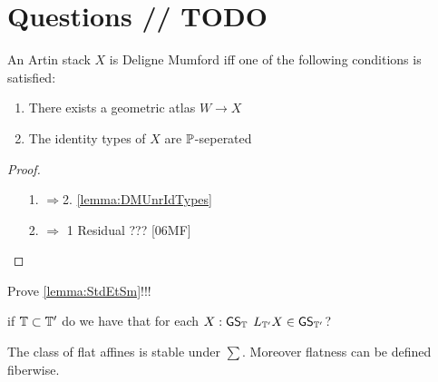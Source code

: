 \documentclass{article}
\renewcommand{\GS}{\mathsf{GS}}
\begin{document}






\section{Questions // TODO}
\begin{theorem}[TODO]
	An Artin stack $X$ is Deligne Mumford iff one of the following conditions is satisfied:
	\begin{enumerate}
		\item There exists a geometric atlas $W \to X$
		\item The identity types of $X$ are $\mathbb{P}$-seperated
	\end{enumerate}
\end{theorem}
\begin{proof}
	\begin{enumerate}
		\item [1. $\Rightarrow $2.] \ref{lemma:DMUnrIdTypes}
		\item [2. $\Rightarrow$ 1] Residual ??? [06MF]
	\end{enumerate}
\end{proof}
Prove \ref{lemma:StdEtSm}!!!
\begin{question}
	if $\mathbb{T} \subset \mathbb{T}'$ do we have that for each $X : \GS_\bT$ $L_{\bT'} X \in \GS_{\bT'}$?
\end{question}
\begin{theorem}[TODO]{\label{thm:FlatAffines}}
	The class of flat affines is stable under $\sum$. Moreover flatness can be defined fiberwise.
\end{theorem}
\end{document}
